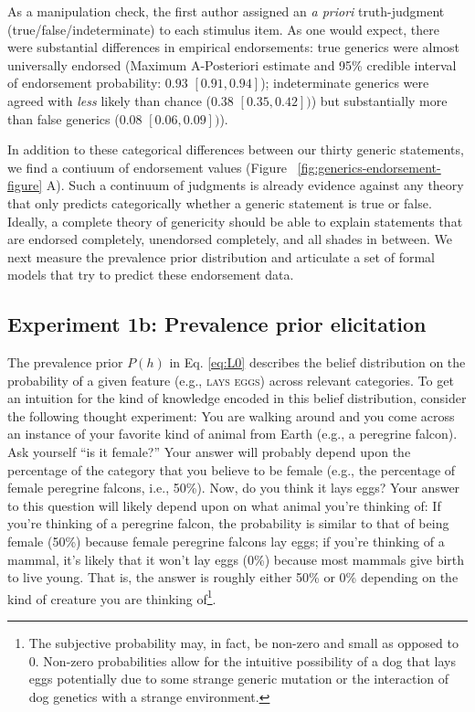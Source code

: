 \documentclass[english,floatsintext,man]{apa6}
\newcounter{author}
\theoremstyle{definition}
\theoremstyle{definition}
\theoremstyle{definition}
\theoremstyle{remark}
\begin{document}
As a manipulation check, the first author assigned an \emph{a priori}
truth-judgment (true/false/indeterminate) to each stimulus item. As one
would expect, there were substantial differences in empirical
endorsements: true generics were almost universally endorsed (Maximum
A-Posteriori estimate and 95\% credible interval of endorsement
probability: \(0.93\) \([0.91, 0.94]\)); indeterminate generics were
agreed with \emph{less} likely than chance (\(0.38\) \([0.35, 0.42])\))
but substantially more than false generics (\(0.08\) \([0.06, 0.09])\)).

In addition to these categorical differences between our thirty generic
statements, we find a contiuum of endorsement values (Figure
~\ref{fig:generics-endorsement-figure} A). Such a continuum of judgments
is already evidence against any theory that only predicts categorically
whether a generic statement is true or false. Ideally, a complete theory
of genericity should be able to explain statements that are endorsed
completely, unendorsed completely, and all shades in between. We next
measure the prevalence prior distribution and articulate a set of formal
models that try to predict these endorsement data.

\subsection{Experiment 1b: Prevalence prior
elicitation}\label{experiment-1b-prevalence-prior-elicitation}

The prevalence prior \(P(h)\) in Eq. \ref{eq:L0} describes the belief
distribution on the probability of a given feature (e.g.,
\textsc{lays eggs}) across relevant categories. To get an intuition for
the kind of knowledge encoded in this belief distribution, consider the
following thought experiment: You are walking around and you come across
an instance of your favorite kind of animal from Earth (e.g., a
peregrine falcon). Ask yourself \enquote{is it female?} Your answer will
probably depend upon the percentage of the category that you believe to
be female (e.g., the percentage of female peregrine falcons, i.e.,
50\%). Now, do you think it lays eggs? Your answer to this question will
likely depend upon on what animal you're thinking of: If you're thinking
of a peregrine falcon, the probability is similar to that of being
female (50\%) because female peregrine falcons lay eggs; if you're
thinking of a mammal, it's likely that it won't lay eggs (0\%) because
most mammals give birth to live young. That is, the answer is roughly
either 50\% or 0\% depending on the kind of creature you are thinking
of\footnote{The subjective probability may, in fact, be non-zero and
  small as opposed to 0. Non-zero probabilities allow for the intuitive
  possibility of a dog that lays eggs potentially due to some strange
  generic mutation or the interaction of dog genetics with a strange
  environment.}.
\end{document}
